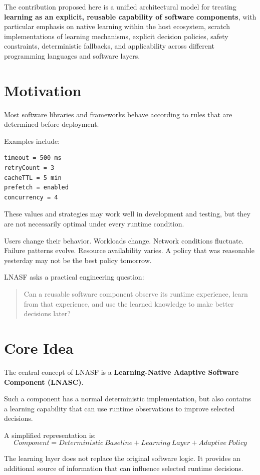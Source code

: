 \documentclass[11pt,a4paper]{article}
\begin{document}
The contribution proposed here is a unified architectural model for treating \textbf{learning as an explicit, reusable capability of software components}, with particular emphasis on native learning within the host ecosystem, scratch implementations of learning mechanisms, explicit decision policies, safety constraints, deterministic fallbacks, and applicability across different programming languages and software layers.

\section{Motivation}
Most software libraries and frameworks behave according to rules that are determined before deployment.

Examples include:
\begin{lstlisting}
timeout = 500 ms
retryCount = 3
cacheTTL = 5 min
prefetch = enabled
concurrency = 4
\end{lstlisting}

These values and strategies may work well in development and testing, but they are not necessarily optimal under every runtime condition.

Users change their behavior. Workloads change. Network conditions fluctuate. Failure patterns evolve. Resource availability varies. A policy that was reasonable yesterday may not be the best policy tomorrow.

LNASF asks a practical engineering question:
\begin{quote}
Can a reusable software component observe its runtime experience, learn from that experience, and use the learned knowledge to make better decisions later?
\end{quote}

\section{Core Idea}
The central concept of LNASF is a \textbf{Learning-Native Adaptive Software Component (LNASC)}.

Such a component has a normal deterministic implementation, but also contains a learning capability that can use runtime observations to improve selected decisions.

A simplified representation is:
\[
Component = Deterministic\ Baseline + Learning\ Layer + Adaptive\ Policy
\]

The learning layer does not replace the original software logic. It provides an additional source of information that can influence selected runtime decisions.
\end{document}
